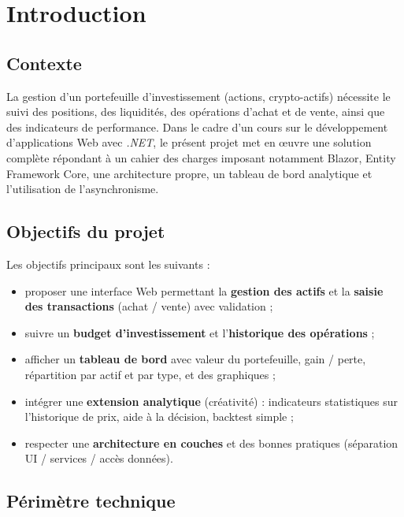 \chapter{Introduction}

\section{Contexte}

La gestion d'un portefeuille d'investissement (actions, crypto-actifs) nécessite le suivi des positions, des liquidités, des opérations d'achat et de vente, ainsi que des indicateurs de performance. Dans le cadre d'un cours sur le développement d'applications Web avec \emph{.NET}, le présent projet met en œuvre une solution complète répondant à un cahier des charges imposant notamment Blazor, Entity Framework Core, une architecture propre, un tableau de bord analytique et l'utilisation de l'asynchronisme.

\section{Objectifs du projet}

Les objectifs principaux sont les suivants :
\begin{itemize}[leftmargin=*]
  \item proposer une interface Web permettant la \textbf{gestion des actifs} et la \textbf{saisie des transactions} (achat / vente) avec validation ;
  \item suivre un \textbf{budget d'investissement} et l'\textbf{historique des opérations} ;
  \item afficher un \textbf{tableau de bord} avec valeur du portefeuille, gain / perte, répartition par actif et par type, et des graphiques ;
  \item intégrer une \textbf{extension analytique} (créativité) : indicateurs statistiques sur l'historique de prix, aide à la décision, backtest simple ;
  \item respecter une \textbf{architecture en couches} et des bonnes pratiques (séparation UI / services / accès données).
\end{itemize}

\section{Périmètre technique}

